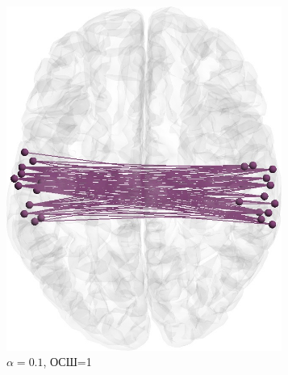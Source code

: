 \begin{figure}[htbp]
\begin{subfigure}[t]{0.24\textwidth}
        \includegraphics[width=0.99\textwidth]{../images/loreta_brain_jitter_01_snr_1_phase_lag_07854.jpg}
        \caption{$\alpha=0.1$, ОСШ=1}\label{fig:unbiased_1_ntw_c}
    \end{subfigure}
    \begin{subfigure}[t]{0.24\textwidth}

\end{subfigure}
\end{figure}
